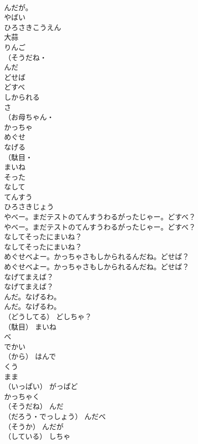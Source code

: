 \documentclass[8pt]{extreport}
\begin{document}
\begin{CJK}{UTF8}{min}
\\	んだが。 
\\	やばい
\\	ひろさきこうえん
\\	大蒜
\\	りんご
\\	（そうだね・
\\	んだ
\\	どせば
\\	どすべ
\\	しかられる
\\	さ
\\	（お母ちゃん・
\\	かっちゃ
\\	めぐせ
\\	なげる
\\	（駄目・
\\	まいね
\\	そった
\\	なして
\\	てんすう
\\	ひろさきじょう
\\	やべー。まだテストのてんすうわるがったじゃー。どすべ？	
\\	やべー。まだテストのてんすうわるがったじゃー。どすべ？ 
\\	なしてそったにまいね？	
\\	なしてそったにまいね？ 
\\	めぐせべよー。かっちゃさもしかられるんだね。どせば？	
\\	めぐせべよー。かっちゃさもしかられるんだね。どせば？ 
\\	なげてまえば？	
\\	なげてまえば？ 
\\	んだ。なげるわ。	
\\	んだ。なげるわ。 
\\	（どうしてる）	どしちゃ？
\\	（駄目）	まいね
\\	べ
\\	でかい
\\	（から）	はんで
\\	くう
\\	まま
\\	（いっぱい）	がっぱど
\\	かっちゃく
\\	（そうだね）	んだ
\\	（だろう・でっしょう）	んだべ
\\	（そうか）	んだが
\\	（している）	しちゃ

\end{CJK}
\end{document}
